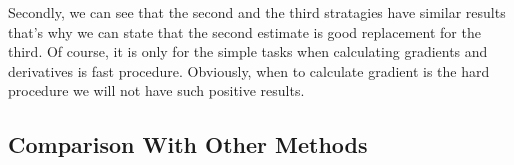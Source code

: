 \documentclass[12pt]{article}
\begin{document}
Secondly, we can see that the second and the third stratagies have similar results that's why we can state that the second estimate is good replacement for the third. Of course, it is only for the simple tasks when calculating gradients and derivatives is fast procedure. Obviously, when to calculate gradient is the hard procedure we will not have such positive results.

\subsection{Comparison With Other Methods}
\label{Comparison}

\begin{figure}[ht!]  
\vspace{-4ex} \centering {}  
\hspace{2ex}
\hspace{2ex}
\vspace{2ex}
\hspace{2ex}

\end{figure}
\end{document}
